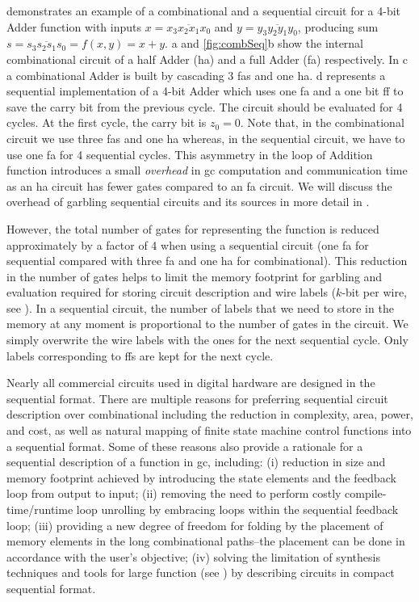  demonstrates an example of a combinational and a sequential circuit for a 4-bit Adder function with inputs $x = \overline{x_3x_2x_1x_0}$ and $y = \overline{y_3y_2y_1y_0}$, producing sum $s = \overline{s_3s_2s_1s_0} = f(x, y) = x + y$.
a and \ref{fig:combSeq}b show the internal combinational circuit of a half Adder (\acrshort{ha}) and a full Adder (\acrshort{fa}) respectively.
In c a combinational Adder is built by cascading 3 \acrshort{fa}s and one \acrshort{ha}.
d represents a sequential implementation of a 4-bit Adder which uses one \acrshort{fa} and a one bit \acrshort{ff} to save the carry bit from the previous cycle.
The circuit should be evaluated for 4 cycles.
At the first cycle, the carry bit is $z_0=0$.
Note that, in the combinational circuit we use three \acrshort{fa}s and one \acrshort{ha} whereas, in the sequential circuit, we have to use one \acrshort{fa} for 4 sequential cycles.
This asymmetry in the loop of Addition function introduces a small \emph{overhead} in \acrshort{gc} computation and communication time as an \acrshort{ha} circuit has fewer gates compared to an \acrshort{fa} circuit.
We will discuss the overhead of garbling sequential circuits and its sources in more detail in .

However, the total number of gates for representing the function is reduced approximately by a factor of 4 when using a sequential circuit (one \acrshort{fa} for sequential compared with three \acrshort{fa} and one \acrshort{ha} for combinational).
This reduction in the number of gates helps to limit the memory footprint for garbling and evaluation required for storing circuit description and wire labels ($k$-bit per wire, see ).
In a sequential circuit, the number of labels that we need to store in the memory at any moment is proportional to the number of gates in the circuit.
We simply overwrite the wire labels with the ones for the next sequential cycle.
Only labels corresponding to \acrshort{ff}s are kept for the next cycle.

Nearly all commercial circuits used in digital hardware are designed in the sequential format.
There are multiple reasons for preferring sequential circuit description over combinational including the reduction in complexity, area, power, and cost, as well as natural mapping of finite state machine control functions into a sequential format.
Some of these reasons also provide a rationale for a sequential description of a function in \acrshort{gc}, including: (i) reduction in size and memory footprint achieved by introducing the state elements and the feedback loop from output to input; (ii) removing the need to perform costly compile-time/runtime loop unrolling by embracing loops within the sequential feedback loop; (iii) providing a new degree of freedom for folding by the placement of memory elements in the long combinational paths--the placement can be done in accordance with the user's objective; (iv) solving the limitation of synthesis techniques and tools for large function (see ) by describing circuits in compact sequential format.

